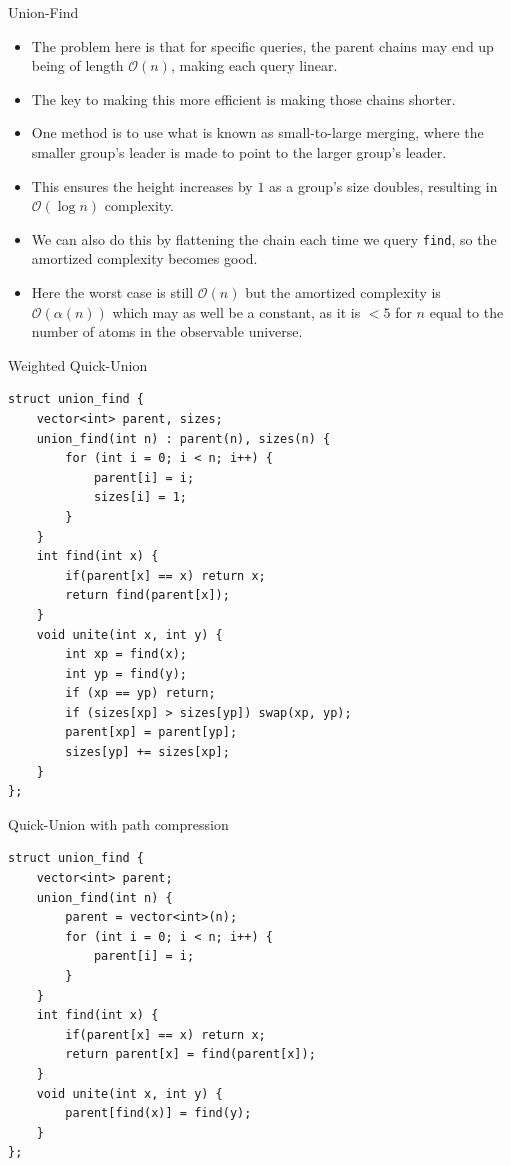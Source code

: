 \documentclass{beamer}
\begin{document}
\begin{frame}[plain]{Union-Find}
    \begin{itemize}
        \item<1-> The problem here is that for specific queries, the parent chains may end up being of length $\mathcal{O}(n)$, making each query linear.
        \item<1-> The key to making this more efficient is making those chains shorter.
        \item<2-> One method is to use what is known as small-to-large merging, where the smaller group's leader is made to point to the larger group's leader.
        \item<2-> This ensures the height increases by $1$ as a group's size doubles, resulting in $\mathcal{O}(\log n)$ complexity.
        \item<3-> We can also do this by flattening the chain each time we query \texttt{find}, so the amortized complexity becomes good.
        \item<3-> Here the worst case is still $\mathcal{O}(n)$ but the amortized complexity is $\mathcal{O}(\alpha(n))$ which may as well be a constant, as it is $<5$ for $n$ equal to the number of atoms in the observable universe.
    \end{itemize}
\end{frame}

\begin{frame}{Weighted Quick-Union}
    \begin{scriptsize}
    \begin{verbatim}
struct union_find {
    vector<int> parent, sizes;
    union_find(int n) : parent(n), sizes(n) {
        for (int i = 0; i < n; i++) {
            parent[i] = i;
            sizes[i] = 1;
        }
    }
    int find(int x) {
        if(parent[x] == x) return x;
        return find(parent[x]);
    }
    void unite(int x, int y) {
        int xp = find(x);
        int yp = find(y);
        if (xp == yp) return;
        if (sizes[xp] > sizes[yp]) swap(xp, yp);
        parent[xp] = parent[yp];
        sizes[yp] += sizes[xp];
    }
};
    \end{verbatim}
    \end{scriptsize}
\end{frame}

\begin{frame}{Quick-Union with path compression}
    \begin{small}
    \begin{verbatim}
struct union_find {
    vector<int> parent;
    union_find(int n) {
        parent = vector<int>(n);
        for (int i = 0; i < n; i++) {
            parent[i] = i;
        }
    }
    int find(int x) {
        if(parent[x] == x) return x;
        return parent[x] = find(parent[x]);
    }
    void unite(int x, int y) {
        parent[find(x)] = find(y);
    }
};
    \end{verbatim}
    \end{small}
\end{frame}
\end{document}

